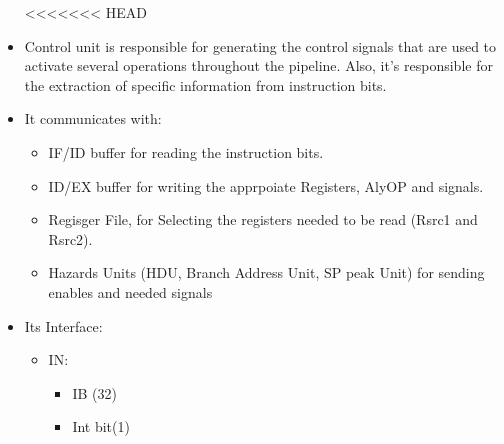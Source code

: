 \documentclass[12pt]{report}
\begin{document}
\begin{itemize}
<<<<<<< HEAD
    \item Control unit is responsible for generating the control signals that are used to activate several operations throughout the pipeline. Also, it's responsible for the extraction of specific information from instruction bits.
    \item It communicates with:
    \begin{itemize}
        \item IF/ID buffer for reading the instruction bits.
        \item ID/EX buffer for writing the apprpoiate Registers, AlyOP and signals.
        \item Regisger File, for Selecting the registers needed to be read (Rsrc1 and Rsrc2).
        \item Hazards Units (HDU, Branch Address Unit, SP peak Unit) for sending enables and needed signals
    \end{itemize}
    \item Its Interface:
    \begin{itemize}
        \item IN: 
        \begin{itemize}
            \item IB (32)
            \item Int bit(1)
        \end{itemize}
    

\end{itemize}
\end{itemize}
\end{document}

